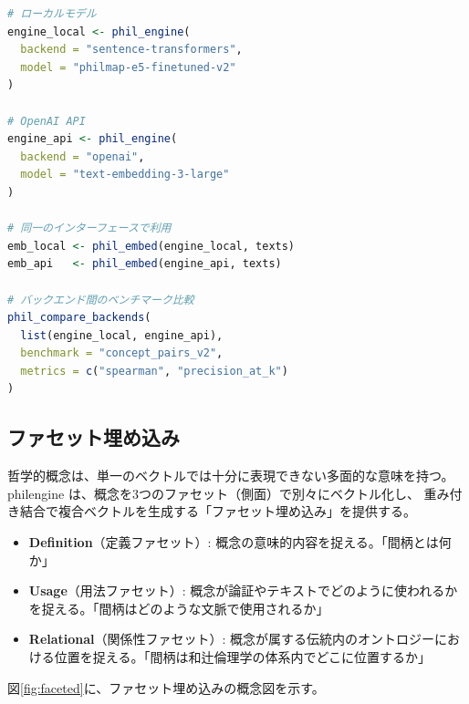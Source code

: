 \documentclass[a4paper,11pt]{ltjsarticle}
\begin{document}
\begin{lstlisting}[language=R,caption=バックエンドの切り替え]
# ローカルモデル
engine_local <- phil_engine(
  backend = "sentence-transformers",
  model = "philmap-e5-finetuned-v2"
)

# OpenAI API
engine_api <- phil_engine(
  backend = "openai",
  model = "text-embedding-3-large"
)

# 同一のインターフェースで利用
emb_local <- phil_embed(engine_local, texts)
emb_api   <- phil_embed(engine_api, texts)

# バックエンド間のベンチマーク比較
phil_compare_backends(
  list(engine_local, engine_api),
  benchmark = "concept_pairs_v2",
  metrics = c("spearman", "precision_at_k")
)
\end{lstlisting}

\subsection{ファセット埋め込み}

哲学的概念は、単一のベクトルでは十分に表現できない多面的な意味を持つ。
philengine は、概念を3つのファセット（側面）で別々にベクトル化し、
重み付き結合で複合ベクトルを生成する「ファセット埋め込み」を提供する。

\begin{itemize}[leftmargin=2em]
  \item \textbf{Definition}（定義ファセット）: 概念の意味的内容を捉える。「間柄とは何か」
  \item \textbf{Usage}（用法ファセット）: 概念が論証やテキストでどのように使われるかを捉える。「間柄はどのような文脈で使用されるか」
  \item \textbf{Relational}（関係性ファセット）: 概念が属する伝統内のオントロジーにおける位置を捉える。「間柄は和辻倫理学の体系内でどこに位置するか」
\end{itemize}

図\ref{fig:faceted}に、ファセット埋め込みの概念図を示す。
\end{document}
